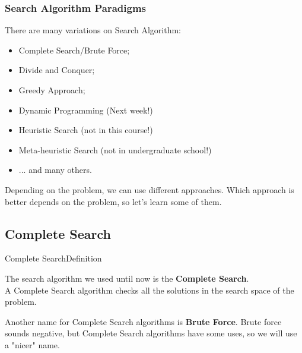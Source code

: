 \begin{frame}
  \frametitle{Search Algorithm Paradigms}
  There are many variations on Search Algorithm:
  \bigskip

  \begin{itemize}
    \item Complete Search/Brute Force;
    \item Divide and Conquer;
    \item Greedy Approach;
    \item Dynamic Programming (Next week!)
    \item Heuristic Search (not in this course!)
    \item Meta-heuristic Search (not in undergraduate school!)
    \item ... and many others.
  \end{itemize}
  \bigskip

  Depending on the problem, we can use different approaches. Which approach is better depends on the problem, so let's learn some of them.
\end{frame}


\subsection{Complete Search}

\begin{frame}{Complete Search}{Definition}

  The search algorithm we used until now is the {\bf Complete Search}.\\
  A Complete Search algorithm checks all the solutions in the search space of the problem.\bigskip

  Another name for Complete Search algorithms is {\bf Brute Force}. Brute force sounds negative, but Complete Search algorithms have some uses, so we will use a "nicer" name.
\end{frame}


